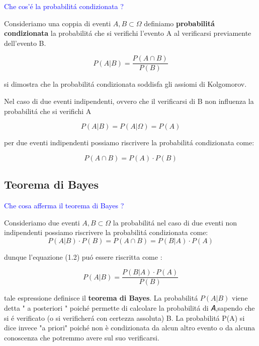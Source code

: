 \textcolor{blue}{Che cos'\'{e} la probabilit\'{a} condizionata ?} \newline

Consideriamo una coppia di eventi $A,B \subset \Omega$ definiamo \textbf{probabilit\'{a} condizionata} la probabilit\'{a} che si verifichi l'evento A al verificarsi previamente dell'evento B. 

\begin{equation}
	P(A \vert B) = \dfrac{P(A\cap B)}{P(B)}
\end{equation}

\noindent si dimostra che la probabilit\'{a} condizionata soddisfa gli assiomi di Kolgomorov.

\noindent Nel caso di due eventi indipendenti, ovvero che il verificarsi di B non influenza la probabilit\'{a} che si verifichi A

\begin{equation*}
	P(A \vert B) = P(A \vert \Omega) = P(A)
\end{equation*}

\noindent per due eventi indipendenti possiamo riscrivere la probabilit\'{a} condizionata come:

\begin{equation}
	P(A \cap B) = P(A) \cdot P(B)
\end{equation}

\subsection{Teorema di Bayes}

\textcolor{blue}{Che cosa afferma il teorema di Bayes ?} \newline

Consideriamo due eventi $A,B \subset \Omega$ la probabilit\'{a} nel caso di due eventi non indipendenti possiamo riscrivere la probabilit\'{a} condizionata come:
\begin{equation*}
	P(A \vert B) \cdot P(B) = P(A\cap B) = P(B\vert A) \cdot P(A)
\end{equation*}

dunque l'equazione (1.2) pu\'{o} essere riscritta come : 

\begin{equation}
	P(A \vert B) = \dfrac{P(B \vert A) \cdot P(A)}{P(B)}
\end{equation}

tale espressione definisce il \textbf{teorema di Bayes}. La probabilit\'{a} 
$P(A \vert B)$ viene detta " a posteriori " poich\'{e} permette di calcolare la probabilit\'{a} di 𝐴,sapendo che si \'{e} verificato (o si verificher\'{a} con certezza assoluta) B. \newline
La probabilit\'{a} P(A) si dice invece "a priori" poich\'{e} non è condizionata da alcun altro evento o da alcuna conoscenza che potremmo avere sul suo verificarsi. 

